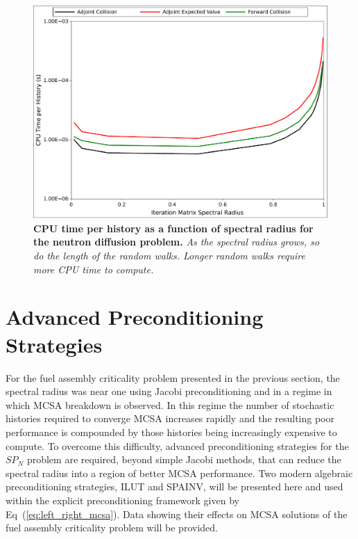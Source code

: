 \begin{figure}[t!]
  \begin{center}
    \includegraphics[width=4.5in]{chapters/spn_equations/breakdown_time.pdf}
  \end{center}
  \caption{\textbf{CPU time per history as a function of spectral
      radius for the neutron diffusion problem.} \textit{As the
      spectral radius grows, so do the length of the random
      walks. Longer random walks require more CPU time to compute.}}
  \label{fig:breakdown_time}
\end{figure}

\clearpage

\section{Advanced Preconditioning Strategies}
\label{subsec:spn_advanced_preconditioning}
For the fuel assembly criticality problem presented in the previous
section, the spectral radius was near one using Jacobi preconditioning
and in a regime in which MCSA breakdown is observed. In this regime
the number of stochastic histories required to converge MCSA increases
rapidly and the resulting poor performance is compounded by those
histories being increasingly expensive to compute. To overcome this
difficulty, advanced preconditioning strategies for the $SP_N$ problem
are required, beyond simple Jacobi methods, that can reduce the
spectral radius into a region of better MCSA performance. Two modern
algebraic preconditioning strategies, ILUT and SPAINV, will be
presented here and used within the explicit preconditioning framework
given by Eq~(\ref{eq:left_right_mcsa}). Data showing their effects on
MCSA solutions of the fuel assembly criticality problem will be
provided.

